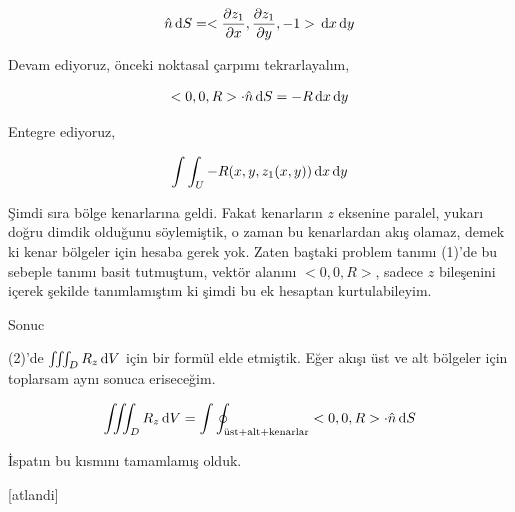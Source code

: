 \documentclass[12pt,fleqn]{article}\usepackage{../../common}
\begin{document}
$$
\hat{n} \,\mathrm{d} S =
<\frac{\partial z_1}{\partial x},
\frac{\partial z_1}{\partial y},
-1 >
\,\mathrm{d} x \,\mathrm{d} y
$$

Devam ediyoruz, önceki noktasal çarpımı tekrarlayalım,

$$
< 0,0,R > \cdot \hat{n} \,\mathrm{d} S = -R \,\mathrm{d} x \,\mathrm{d} y
$$

Entegre ediyoruz,

$$
\int \int_U -R (x,y,z_1(x,y)) \,\mathrm{d} x \,\mathrm{d} y
$$

Şimdi sıra bölge kenarlarına geldi. Fakat kenarların $z$ eksenine paralel,
yukarı doğru dimdik olduğunu söylemiştik, o zaman bu kenarlardan akış olamaz,
demek ki kenar bölgeler için hesaba gerek yok. Zaten baştaki problem tanımı
(1)'de bu sebeple tanımı basit tutmuştum, vektör alanını $< 0,0,R > $,
sadece $z$ bileşenini içerek şekilde tanımlamıştım ki şimdi bu ek hesaptan
kurtulabileyim.

Sonuc

(2)'de $\iiint_D R_z \,\mathrm{d} V$ için bir formül elde etmiştik. Eğer akışı üst
ve alt bölgeler için toplarsam aynı sonuca eriseceğim.

$$
\iiint_D R_z \,\mathrm{d} V = \int \oint_{\textrm{üst+alt+kenarlar}} < 0,0,R >
\cdot \hat{n} \,\mathrm{d} S
$$

İspatın bu kısmını tamamlamış olduk.

[atlandi]
\end{document}
